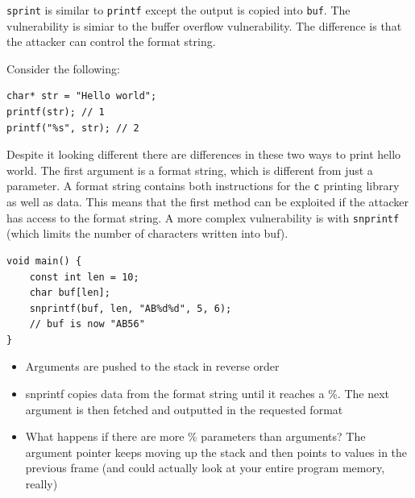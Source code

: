 \documentclass[../notes.tex]{subfiles}
\begin{document}
\texttt{sprint} is similar to \texttt{printf} except the output is copied into \texttt{buf}. The vulnerability is simiar to the buffer overflow vulnerability. The difference is that the attacker can control the format string.

Consider the following:

\begin{listing}[H]
\begin{verbatim}
char* str = "Hello world";
printf(str); // 1
printf("%s", str); // 2
\end{verbatim}
\end{listing}

Despite it looking different there are differences in these two ways to print hello world.
The first argument is a format string, which is different from just a parameter.
A format string contains both instructions for the \texttt{c} printing library as well as data.
This means that the first method can be exploited if the attacker has access to the format string.
A more complex vulnerability is with \texttt{snprintf} (which limits the number of characters written into buf).



\begin{listing}[H]
\begin{verbatim}
void main() {
    const int len = 10;
    char buf[len];
    snprintf(buf, len, "AB%d%d", 5, 6);
    // buf is now "AB56"
}
\end{verbatim}
\end{listing}

\begin{itemize}
    \item Arguments are pushed to the stack in reverse order
    \item snprintf copies data from the format string until it reaches a \%. The next argument is then fetched and outputted in the requested format
    \item What happens if there are more \% parameters than arguments? The argument pointer keeps moving up the stack and then points to values in the previous frame (and could actually look at your entire program memory, really)
\end{itemize}
\end{document}
